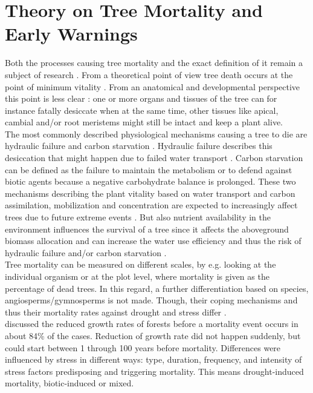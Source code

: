 \section{Theory on Tree Mortality and Early Warnings}\label{sec:theory}
Both the processes causing tree mortality and the exact definition of it remain a subject of research \citep{hartmann2015}. From a theoretical point of view tree death occurs at the point of minimum vitality \citep{dobbertin2005, grivcar2012}. From an anatomical and developmental perspective this point is less clear \citep{schenk2008}: one or more organs and tissues of the tree can for instance fatally desiccate when at the same time, other tissues like apical, cambial and/or root meristems might still be intact and keep a plant alive.\\
The most commonly described physiological mechanisms causing a tree to die are hydraulic failure and carbon starvation \citep{sevanto2014}. Hydraulic failure describes this desiccation that might happen due to failed water transport \citep{mcdowell2011b}. Carbon starvation can be defined as the failure to maintain the metabolism or to defend against biotic agents because a negative carbohydrate balance is prolonged. These two mechanisms describing the plant vitality based on water transport and carbon assimilation, mobilization and concentration are expected to increasingly affect trees due to future extreme events \citep{brauning2017}. But also nutrient availability in the environment influences the survival of a tree since it affects the aboveground biomass allocation and can increase the water use efficiency and thus the risk of hydraulic failure and/or carbon starvation \citep{gessler2017}.\\
Tree mortality can be measured on different scales, by e.g. looking at the individual organism or at the plot level, where mortality is given as the percentage of dead trees. In this regard, a further differentiation based on species, angiosperms/gymnosperms is not made. Though, their coping mechanisms and thus their mortality rates against drought and stress differ  \citep[e.g.][]{chaparro2017}.\\
\cite{cailleret2017} discussed the reduced growth rates of forests before a mortality event occurs in about 84\% of the cases. Reduction of growth rate did not happen suddenly, but could start between 1 through 100 years before mortality. Differences were influenced by stress in different ways: type, duration, frequency, and intensity of stress factors predisposing and triggering mortality. This means drought-induced mortality, biotic-induced or mixed.\\
